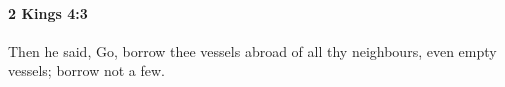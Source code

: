 
		\paragraph{2 Kings 4:3} %
			\label{2KINGS-4-3}

			Then he said, Go, borrow thee vessels abroad of all thy neighbours, even empty vessels; borrow not a few.



